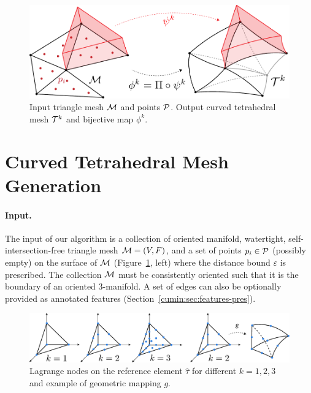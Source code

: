
\begin{figure}
    \centering
    \includegraphics[width=.8\linewidth]{curve_meshing_in_shell_tex/figs/illustrations/input-output.pdf}
    \caption{Input triangle mesh $\M$ and points $\P$. Output curved tetrahedral mesh $\T^k$ and bijective map $\phi^k$.}
    \label{bichon:fig:input-output}
\end{figure}

\section{Curved Tetrahedral Mesh Generation}\label{cumin:sec:curved-pipeline}



\paragraph{Input.}
The input of our algorithm is a collection of oriented manifold, watertight, self-intersection-free triangle mesh $\M=(V,F)$, and a set of points $p_i\in\P$ (possibly empty) on the surface of $\M$ (Figure~\ref{bichon:fig:input-output}, left) where the distance bound $\varepsilon$ is prescribed. The collection $\M$ must be consistently oriented such that it is the boundary of an oriented 3-manifold.
A set of edges can also be optionally provided as annotated features (Section~\ref{cumin:sec:features-pres}).

\begin{figure}
    \centering
    \includegraphics[width=\linewidth]{curve_meshing_in_shell_tex/figs/illustrations/high-order.pdf}
    \caption{Lagrange nodes on the reference element $\hat \tau$ for different $k=1,2,3$ and example of geometric mapping $g$.}
    \label{bichon:fig:high-order}
\end{figure}

